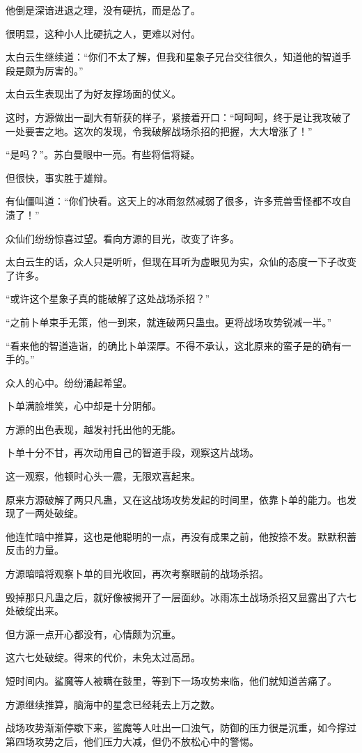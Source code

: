 \begin{this_body}
他倒是深谙进退之理，没有硬抗，而是怂了。

很明显，这种小人比硬抗之人，更难以对付。

太白云生继续道：“你们不太了解，但我和星象子兄台交往很久，知道他的智道手段是颇为厉害的。”

太白云生表现出了为好友撑场面的仗义。

这时，方源做出一副大有斩获的样子，紧接着开口：“呵呵呵，终于是让我攻破了一处要害之地。这次的发现，令我破解战场杀招的把握，大大增涨了！”

“是吗？”。苏白曼眼中一亮。有些将信将疑。

但很快，事实胜于雄辩。

有仙僵叫道：“你们快看。这天上的冰雨忽然减弱了很多，许多荒兽雪怪都不攻自溃了！”

众仙们纷纷惊喜过望。看向方源的目光，改变了许多。

太白云生的话，众人只是听听，但现在耳听为虚眼见为实，众仙的态度一下子改变了许多。

“或许这个星象子真的能破解了这处战场杀招？”

“之前卜单束手无策，他一到来，就连破两只蛊虫。更将战场攻势锐减一半。”

“看来他的智道造诣，的确比卜单深厚。不得不承认，这北原来的蛮子是的确有一手的。”

众人的心中。纷纷涌起希望。

卜单满脸堆笑，心中却是十分阴郁。

方源的出色表现，越发衬托出他的无能。

卜单十分不甘，再次动用自己的智道手段，观察这片战场。

这一观察，他顿时心头一震，无限欢喜起来。

原来方源破解了两只凡蛊，又在这战场攻势发起的时间里，依靠卜单的能力。也发现了一两处破绽。

他连忙暗中推算，这也是他聪明的一点，再没有成果之前，他按捺不发。默默积蓄反击的力量。

方源暗暗将观察卜单的目光收回，再次考察眼前的战场杀招。

毁掉那只凡蛊之后，就好像被揭开了一层面纱。冰雨冻土战场杀招又显露出了六七处破绽出来。

但方源一点开心都没有，心情颇为沉重。

这六七处破绽。得来的代价，未免太过高昂。

短时间内。鲨魔等人被瞒在鼓里，等到下一场攻势来临，他们就知道苦痛了。

方源继续推算，脑海中的星念已经耗去上万之数。

战场攻势渐渐停歇下来，鲨魔等人吐出一口浊气，防御的压力很是沉重，如今撑过第四场攻势之后，他们压力大减，但仍不放松心中的警惕。


\end{this_body}
